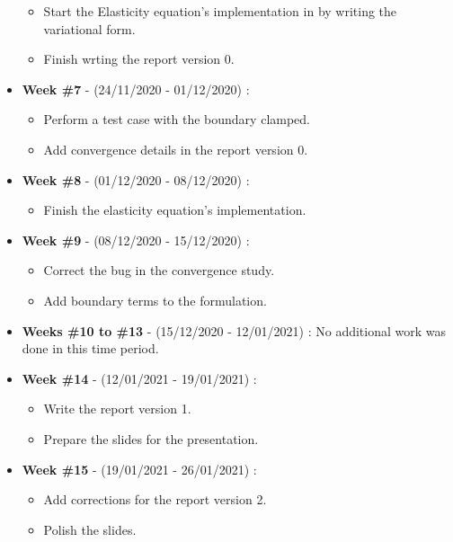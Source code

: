 \begin{itemize}
\begin{itemize}
        \item Start the Elasticity equation's implementation in \phifem  by writing the variational form.
        \item Finish wrting the report version 0.
    \end{itemize} 
    \item \textbf{Week \#7} - (24/11/2020 - 01/12/2020) : \begin{itemize}
        \item Perform a test case with the boundary clamped.
        \item Add convergence details in the report version 0.
    \end{itemize} 
    \item \textbf{Week \#8} - (01/12/2020 - 08/12/2020) : \begin{itemize}
        \item Finish the elasticity equation's \phifem implementation.
    \end{itemize} 
    \item \textbf{Week \#9} - (08/12/2020 - 15/12/2020) : \begin{itemize}
        \item Correct the bug in the convergence study.   
        \item Add boundary terms to the formulation.
    \end{itemize} 
    \item \textbf{Weeks \#10 to \#13} - (15/12/2020 - 12/01/2021) : No additional work was done in this time period.
    \item \textbf{Week \#14} - (12/01/2021 - 19/01/2021) : \begin{itemize}
        \item Write the report version 1.   
        \item Prepare the slides for the presentation.
    \end{itemize}
    \item \textbf{Week \#15} - (19/01/2021 - 26/01/2021) : \begin{itemize}
        \item Add corrections for the report version 2. 
        \item Polish the slides.  
    \end{itemize}
\end{itemize}
